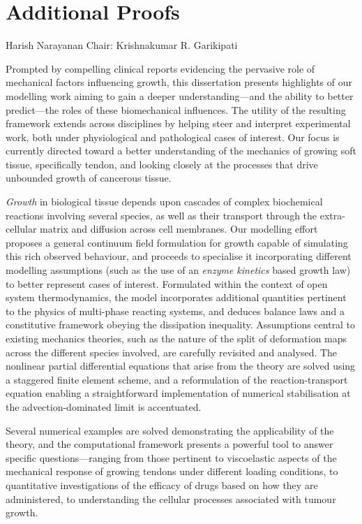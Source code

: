 \documentclass[leqno,final]{report}
\begin{document}
\startappendices
\chapter{Additional Proofs}
\label{additional-proofs}




 {Harish Narayanan} {Chair: Krishnakumar
  R. Garikipati}

Prompted by compelling clinical reports evidencing the pervasive role
of mechanical factors influencing growth, this dissertation presents
highlights of our modelling work aiming to gain a deeper
understanding---and the ability to better predict---the roles of these
biomechanical influences. The utility of the resulting framework
extends across disciplines by helping steer and interpret experimental
work, both under physiological and pathological cases of interest. Our
focus is currently directed toward a better understanding of the
mechanics of growing soft tissue, specifically tendon, and looking
closely at the processes that drive unbounded growth of cancerous
tissue.

{\em Growth} in biological tissue depends upon cascades of complex
biochemical reactions involving several species, as well as their
transport through the extra-cellular matrix and diffusion across cell
membranes. Our modelling effort proposes a general continuum field
formulation for growth capable of simulating this rich observed
behaviour, and proceeds to specialise it incorporating different
modelling assumptions (such as the use of an {\sl enzyme kinetics}
based growth law) to better represent cases of interest. Formulated
within the context of open system thermodynamics, the model
incorporates additional quantities pertinent to the physics of
multi-phase reacting systems, and deduces balance laws and a
constitutive framework obeying the dissipation inequality. Assumptions
central to existing mechanics theories, such as the nature of the
split of deformation maps across the different species involved, are
carefully revisited and analysed. The nonlinear partial differential
equations that arise from the theory are solved using a staggered
finite element scheme, and a reformulation of the reaction-transport
equation enabling a straightforward implementation of numerical
stabilisation at the advection-dominated limit is accentuated.

Several numerical examples are solved demonstrating the applicability
of the theory, and the computational framework presents a powerful
tool to answer specific questions---ranging from those pertinent to
viscoelastic aspects of the mechanical response of growing tendons
under different loading conditions, to quantitative investigations of
the efficacy of drugs based on how they are administered, to
understanding the cellular processes associated with tumour growth.

\thispagestyle{empty}
\end{document}
